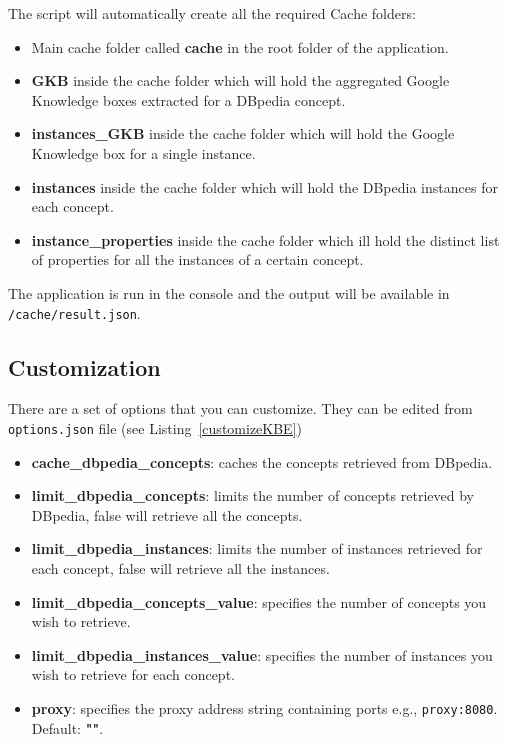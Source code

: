 The script will automatically create all the required Cache folders:

\begin{itemize}
	\item Main cache folder called \textbf{cache} in the root folder of the application.
	\item \textbf{GKB} inside the cache folder which will hold the aggregated Google Knowledge boxes extracted for a DBpedia concept.
	\item \textbf{instances\_GKB} inside the cache folder which will hold the Google Knowledge box for a single instance.
	\item \textbf{instances} inside the cache folder which will hold the DBpedia instances for each concept.
	\item \textbf{instance\_properties} inside the cache folder which ill hold the distinct list of properties for all the instances of a certain concept.
\end{itemize}

The application is run in the console and the output will be available in \texttt{/cache/result.json}.

\subsection{Customization}

There are a set of options that you can customize. They can be edited from \texttt{options.json} file (see Listing~\ref{customizeKBE})



\begin{itemize}
	\item \textbf{cache\_dbpedia\_concepts}: caches the concepts retrieved from
	  DBpedia.
	\item \textbf{limit\_dbpedia\_concepts}: limits the number of concepts
	  retrieved by DBpedia, false will retrieve all the concepts.
	\item \textbf{limit\_dbpedia\_instances}: limits the number of instances
	  retrieved for each concept, false will retrieve all the instances.
	\item \textbf{limit\_dbpedia\_concepts\_value}: specifies the number of concepts you wish to retrieve.
	\item \textbf{limit\_dbpedia\_instances\_value}: specifies the number of instances you wish to retrieve for each concept.
	\item \textbf{proxy}: specifies the proxy address string containing ports e.g., \texttt{proxy:8080}. Default: \textbf{""}.
\end{itemize}

